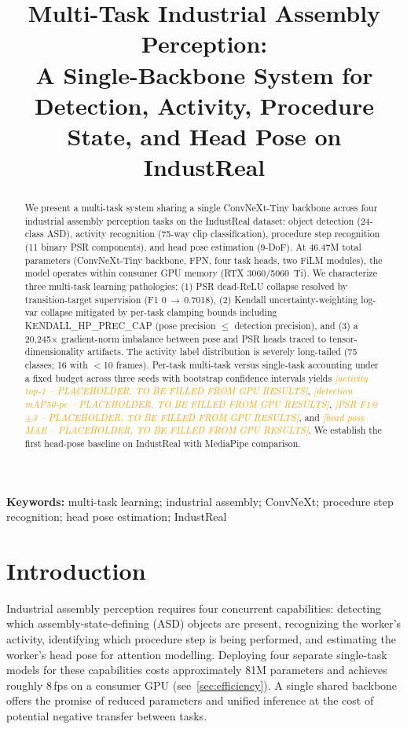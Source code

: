 \documentclass[conference]{IEEEtran}
\title{Multi-Task Industrial Assembly Perception: \\ A Single-Backbone System for Detection, Activity, Procedure State, and Head Pose on IndustReal}
\author{\IEEEauthorblockN{Bashara Aina}
\IEEEauthorblockA{Nihon University, Tokyo\\
Email: bashara.aina@nihon-u.ac.jp}}
\newcommand{\resultplaceholder}[1]{\textcolor{orange}{\emph{[#1 -- PLACEHOLDER, TO BE FILLED FROM GPU RESULTS]}}}
\begin{document}
\maketitle

\begin{abstract}
We present a multi-task system sharing a single ConvNeXt-Tiny backbone across four industrial assembly perception tasks on the IndustReal dataset: object detection (24-class ASD), activity recognition (75-way clip classification), procedure step recognition (11 binary PSR components), and head pose estimation (9-DoF). At 46.47M total parameters (ConvNeXt-Tiny backbone, FPN, four task heads, two FiLM modules), the model operates within consumer GPU memory (RTX 3060/5060~Ti). We characterize three multi-task learning pathologies: (1) PSR dead-ReLU collapse resolved by transition-target supervision (F1 0\,$\to$\,0.7018), (2) Kendall uncertainty-weighting log-var collapse mitigated by per-task clamping bounds including KENDALL\_HP\_PREC\_CAP (pose precision $\leq$ detection precision), and (3) a 20,245$\times$ gradient-norm imbalance between pose and PSR heads traced to tensor-dimensionality artifacts. The activity label distribution is severely long-tailed (75 classes; 16 with $<$10 frames). Per-task multi-task versus single-task accounting under a fixed budget across three seeds with bootstrap confidence intervals yields \resultplaceholder{activity top-1}, \resultplaceholder{detection mAP50-pc}, \resultplaceholder{PSR F1@$\pm$3}, and \resultplaceholder{head pose MAE}. We establish the first head-pose baseline on IndustReal with MediaPipe comparison.
\end{abstract}

\textbf{Keywords:} multi-task learning; industrial assembly; ConvNeXt; procedure step recognition; head pose estimation; IndustReal

\section{Introduction}
\label{sec:intro}

Industrial assembly perception requires four concurrent capabilities: detecting which assembly-state-defining (ASD) objects are present, recognizing the worker's activity, identifying which procedure step is being performed, and estimating the worker's head pose for attention modelling. Deploying four separate single-task models for these capabilities costs approximately 81M parameters and achieves roughly 8\,fps on a consumer GPU (see~\cref{sec:efficiency}). A single shared backbone offers the promise of reduced parameters and unified inference at the cost of potential negative transfer between tasks.
\end{document}
